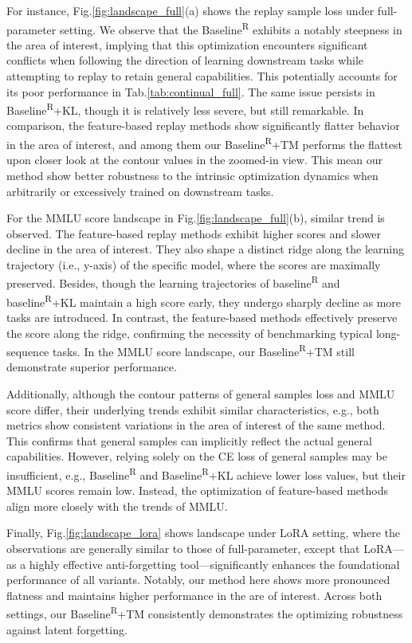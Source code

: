 For instance, Fig.\ref{fig:landscape_full}(a) shows the replay sample loss under full-parameter setting.
We observe that the Baseline\textsuperscript{R} exhibits a notably steepness in the area of interest, implying that this optimization encounters significant conflicts when following the direction of learning downstream tasks while attempting to replay to retain general capabilities. This potentially accounts for its poor performance in Tab.\ref{tab:continual_full}.
The same issue persists in Baseline\textsuperscript{R}+KL, though it is relatively less severe, but still remarkable.
In comparison, the feature-based replay methods show significantly flatter behavior in the area of interest, and among them our Baseline\textsuperscript{R}+TM performs the flattest upon closer look at the contour values in the zoomed-in view. This mean our method show better robustness to the intrinsic optimization dynamics when arbitrarily or excessively trained on downstream tasks.

For the MMLU score landscape in Fig.\ref{fig:landscape_full}(b), similar trend is observed. The feature-based replay methods exhibit higher scores and slower decline in the area of interest.
They also shape a distinct ridge along the learning trajectory (i.e., y-axis) of the specific model, where the scores are maximally preserved.
Besides, though the learning trajectories of baseline\textsuperscript{R} and baseline\textsuperscript{R}+KL maintain a high score early, they undergo sharply decline as more tasks are introduced. In contrast, the feature-based methods effectively preserve the score along the ridge, confirming the necessity of benchmarking typical long-sequence tasks.
In the MMLU score landscape, our Baseline\textsuperscript{R}+TM still demonstrate superior performance.

Additionally, although the contour patterns of general samples loss and MMLU score differ, their underlying trends exhibit similar characteristics, e.g., both metrics show consistent variations in the area of interest of the same method. This confirms that general samples can implicitly reflect the actual general capabilities.
However, relying solely on the CE loss of general samples may be insufficient, e.g., Baseline\textsuperscript{R} and Baseline\textsuperscript{R}+KL achieve lower loss values, but their MMLU scores remain low.
Instead, the optimization of feature-based methods align more closely with the trends of MMLU.

Finally, Fig.\ref{fig:landscape_lora} shows landscape under LoRA setting, where the observations are generally similar to those of full-parameter, except that LoRA---as a highly effective anti-forgetting tool---significantly enhances the foundational performance of all variants. Notably, our method here shows more pronounced flatness and maintains higher performance in the are of interest. Across both settings, our Baseline\textsuperscript{R}+TM consistently demonstrates the optimizing robustness against latent forgetting.
